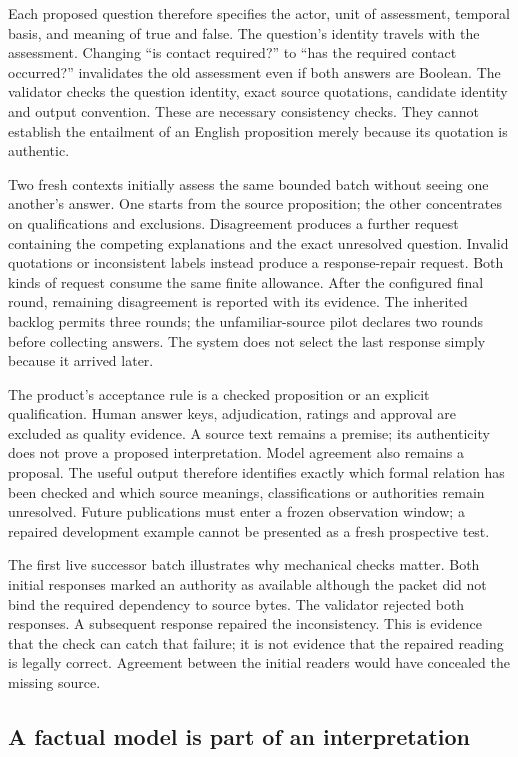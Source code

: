 \documentclass[12pt,a4paper,oneside,openany]{book}
\begin{document}
Each proposed question therefore specifies the actor, unit of assessment,
temporal basis, and meaning of true and false. The question's identity travels
with the assessment. Changing ``is contact required?'' to ``has the required
contact occurred?'' invalidates the old assessment even if both answers are
Boolean. The validator checks the question identity, exact source quotations,
candidate identity and output convention. These are necessary consistency
checks. They cannot establish the entailment of an English proposition merely
because its quotation is authentic.

Two fresh contexts initially assess the same bounded batch without seeing one
another's answer. One starts from the source proposition; the other concentrates
on qualifications and exclusions. Disagreement produces a further request
containing the competing explanations and the exact unresolved question.
Invalid quotations or inconsistent labels instead produce a response-repair
request. Both kinds of request consume the same finite allowance. After the
configured final round, remaining disagreement is reported with its evidence.
The inherited backlog permits three rounds; the unfamiliar-source pilot
declares two rounds before collecting answers. The system
does not select the last response simply because it arrived later.

The product's acceptance rule is a checked proposition or an explicit
qualification. Human answer keys, adjudication, ratings and approval are
excluded as quality evidence. A source text remains a premise; its authenticity
does not prove a proposed interpretation. Model agreement also remains a
proposal. The useful output therefore identifies exactly which formal relation
has been checked and which source meanings, classifications or authorities
remain unresolved. Future publications must enter a frozen observation window;
a repaired development example cannot be presented as a fresh prospective test.

The first live successor batch illustrates why mechanical checks matter.
Both initial responses marked an authority as available although the packet
did not bind the required dependency to source bytes. The validator rejected
both responses. A subsequent response repaired the inconsistency. This is
evidence that the check can catch that failure; it is not evidence that the
repaired reading is legally correct. Agreement between the initial readers
would have concealed the missing source.

\subsection{A factual model is part of an interpretation}
\end{document}
